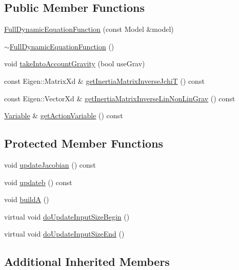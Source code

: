 \subsection*{Public Member Functions}
\begin{DoxyCompactItemize}
\item 
\hyperlink{group__constraint_ga778bffa6d85a494b3ee0c499400573a6}{Full\+Dynamic\+Equation\+Function} (const Model \&model)
\item 
\hyperlink{group__constraint_gab3c2d35bef3c4d8733b7ab0e9ff48bfc}{$\sim$\+Full\+Dynamic\+Equation\+Function} ()
\item 
void \hyperlink{group__constraint_ga673fd9a47a249d84ce527011a06417aa}{take\+Into\+Account\+Gravity} (bool use\+Grav)
\item 
const Eigen\+::\+Matrix\+Xd \& \hyperlink{group__constraint_gaf2529ade8eb0c03afaaed34a4e82e144}{get\+Inertia\+Matrix\+Inverse\+JchiT} () const
\item 
const Eigen\+::\+Vector\+Xd \& \hyperlink{group__constraint_ga6d0c4ebdceec4ea4569266155ca41172}{get\+Inertia\+Matrix\+Inverse\+Lin\+Non\+Lin\+Grav} () const
\item 
\hyperlink{classocra_1_1Variable}{Variable} \& \hyperlink{group__constraint_gaa3c3057ca6a00bf88c372d0c467bed67}{get\+Action\+Variable} () const
\end{DoxyCompactItemize}
\subsection*{Protected Member Functions}
\begin{DoxyCompactItemize}
\item 
void \hyperlink{group__constraint_ga5b4ea2e9706cd848923c835e2df0eff5}{update\+Jacobian} () const
\item 
void \hyperlink{group__constraint_gafab74164b55cd66d2b132915774b59f0}{updateb} () const
\item 
void \hyperlink{group__constraint_ga19d9bbe4f78b4c396930388a70b8cd4b}{buildA} ()
\item 
virtual void \hyperlink{group__constraint_gadbdce52af8ba057e93ea923db5a3ce04}{do\+Update\+Input\+Size\+Begin} ()
\item 
virtual void \hyperlink{group__constraint_ga8c14a0ff3f87c32d030a3a1753b7a77e}{do\+Update\+Input\+Size\+End} ()
\end{DoxyCompactItemize}
\subsection*{Additional Inherited Members}


